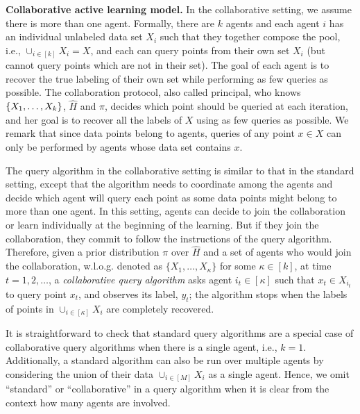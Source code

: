 \textbf{Collaborative active learning model.}
In the collaborative setting, we assume there is more than one agent.  
Formally, there are $k$ agents and each agent $i$ has an individual unlabeled data set $X_i$ such that they together compose the pool, i.e., $\cup_{i\in [k]}X_i = X$, and each can query points from their own set $X_i$ (but cannot query points which are not in their set).
The goal of each agent is to recover the true labeling of their own set while performing as few queries as possible. 
The collaboration protocol, also called principal, who knows $\{X_1,\ldots,X_k\}$, $\hat{H}$ and $\pi$, decides which point should be queried at each iteration, and her goal is to recover all the labels of $X$ using as few queries as possible. 
We remark that since data points belong to agents, queries of any point $x\in X$ can only be performed by agents whose data set contains $x$.

The query algorithm in the collaborative setting is similar to that in the standard setting, except that the algorithm needs to coordinate among the agents and decide which agent will query each point as some data points might belong to more than one agent.
In this setting, agents can decide to join the collaboration or learn individually at the beginning of the learning. But if they join the collaboration, they commit to follow the instructions of the query algorithm.
Therefore, given a prior distribution $\pi$ over $\hat H$ and a set of agents who would join the collaboration, w.l.o.g. denoted as $\{X_1,\ldots,X_\kappa\}$ for some $\kappa\in [k]$, at time $t=1,2,\ldots$, a \textit{collaborative query algorithm} asks agent $i_t\in [\kappa]$ such that $x_t\in X_{i_t}$ to query point $x_t$, and 
observes its label, $y_t$; the algorithm stops when the labels of points in $\cup_{i\in [\kappa]}X_i$ are completely recovered.

It is straightforward to check that standard query algorithms are a special case of collaborative query algorithms when there is a single agent, i.e., $k=1$. Additionally, a standard algorithm can also be run over multiple agents by considering the union of their data $\cup_{i\in [M]} X_i$ as a single agent.
Hence, we omit ``standard'' or ``collaborative'' in a query algorithm when it is clear from the context how many agents are involved.

